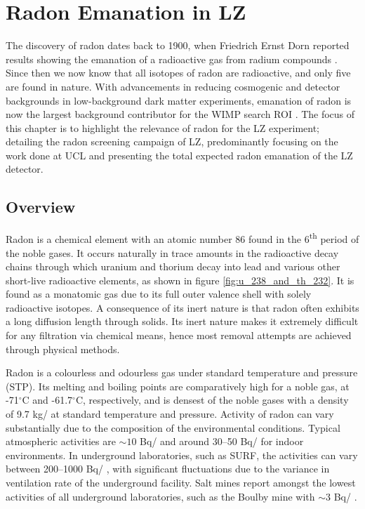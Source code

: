 \chapter{Radon Emanation in LZ}
\label{chap:chap4}

The discovery of radon dates back to 1900, when Friedrich Ernst Dorn reported results showing the emanation of a radioactive gas from radium compounds \cite{PARTINGTON1957}. Since then we now know that all isotopes of radon are radioactive, and only five are found in nature. With advancements in reducing cosmogenic and detector backgrounds in low-background dark matter experiments, emanation of radon is now the largest background contributor for the WIMP search ROI \cite{akerib2018projected}. The focus of this chapter is to highlight the relevance of radon for the LZ experiment; detailing the radon screening campaign of LZ, predominantly focusing on the work done at UCL and presenting the total expected radon emanation of the LZ detector.


\section{Overview}

Radon is a chemical element with an atomic number 86 found in the 6\textsuperscript{th} period of the noble gases. It occurs naturally in trace amounts in the radioactive decay chains through which uranium and thorium decay into lead and various other short-live radioactive elements, as shown in figure \ref{fig:u_238_and_th_232}. It is found as a monatomic gas due to its full outer valence shell with solely radioactive isotopes. A consequence of its inert nature is that radon often exhibits a long diffusion length through solids. Its inert nature makes it extremely difficult for any filtration via chemical means, hence most removal attempts are achieved through physical methods. 

Radon is a colourless and odourless gas under standard temperature and pressure (STP). Its melting and boiling points are comparatively high for a noble gas, at -71$^{\circ}$C and -61.7$^{\circ}$C, respectively, and is densest of the noble gases with a density of 9.7 kg/\cubicmeter{} at standard temperature and pressure. Activity of radon can vary substantially due to the composition of the environmental conditions. Typical atmospheric activities are $\sim10$ Bq/\cubicmeter{} and around 30--50 Bq/\cubicmeter{} for indoor environments. In underground laboratories, such as SURF, the activities can vary between 200--1000 Bq/\cubicmeter{} \cite{Heise_2015}, with significant fluctuations due to the variance in ventilation rate of the underground facility. Salt mines report amongst the lowest activities of all underground laboratories, such as the Boulby mine with $\sim3$ Bq/\cubicmeter{} \cite{scovell_boulby}. 

